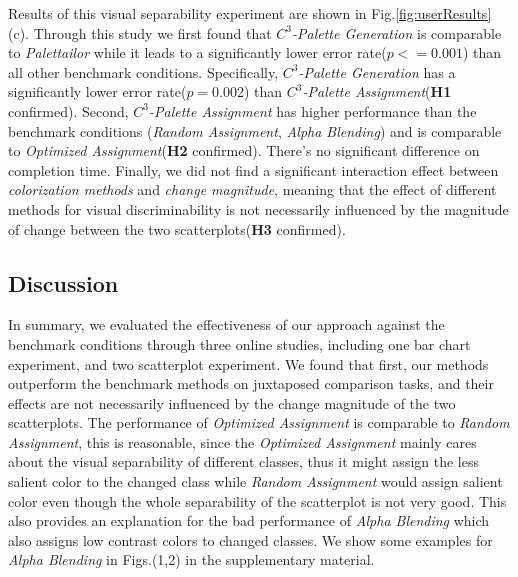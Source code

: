 {%
{}
Results of this visual separability experiment are shown in Fig.\ref{fig:userResults} (c).
Through this study we first found that \emph{$C^3$-Palette Generation} is comparable to \emph{Palettailor} while it leads to a significantly lower error rate(\emph{$p<=0.001$}) than all other benchmark conditions. Specifically, \emph{$C^3$-Palette Generation} has a significantly lower error rate(\emph{$p=0.002$}) than \emph{$C^3$-Palette Assignment}(\textbf{H1} confirmed).
Second, \emph{$C^3$-Palette Assignment} has higher performance than the benchmark conditions (\emph{Random Assignment}, \emph{Alpha Blending}) and is comparable to \emph{Optimized Assignment}(\textbf{H2} confirmed). There's no significant difference on completion time.
Finally, we did not find a significant interaction effect between \emph{colorization methods} and \emph{change magnitude}, meaning that the effect of different methods for visual discriminability is not
necessarily influenced by the magnitude of change between the two scatterplots(\textbf{H3} confirmed).

\subsection{Discussion}
\label{subsec:discussionEval}
In summary, we evaluated the effectiveness of our approach against the benchmark conditions through three online studies, including one bar chart experiment, and two scatterplot experiment.
We found that first, our methods outperform the benchmark methods on juxtaposed comparison tasks, and their effects are not necessarily influenced by the change magnitude of the two scatterplots.
The performance of \emph{Optimized Assignment} is comparable to \emph{Random Assignment}, this is reasonable, since the \emph{Optimized Assignment} mainly cares about the visual separability of different classes, thus it might assign the less salient color to the changed class while \emph{Random Assignment} would assign salient color even though the whole separability of the scatterplot is not very good. This also provides an explanation for the bad performance of \emph{Alpha Blending} which also assigns low contrast colors to changed classes. We show some examples for \emph{Alpha Blending} in Figs.(1,2) in the supplementary material.

}
